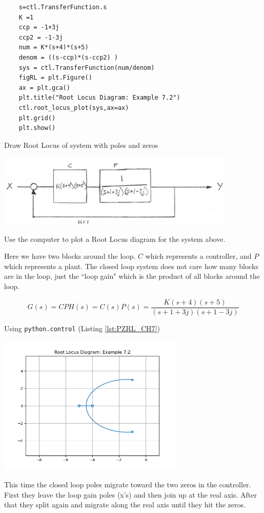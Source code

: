\vspace{0.75in}

\begin{listing}
  \begin{verbatim}
    s=ctl.TransferFunction.s
    K =1
    ccp = -1+3j
    ccp2 = -1-3j
    num = K*(s+4)*(s+5)
    denom = ((s-ccp)*(s-ccp2) )
    sys = ctl.TransferFunction(num/denom)
    figRL = plt.Figure()
    ax = plt.gca()
    plt.title("Root Locus Diagram: Example 7.2")
    ctl.root_locus_plot(sys,ax=ax)
    plt.grid()
    plt.show()
  \end{verbatim}
  \caption{Draw Root Locus of system with poles and zeros}
  \label{lst:PZRL_CH7}
\end{listing}

\begin{ExampleSmall}\label{contplantrootlocus}


\includegraphics[width=4.5in]{figs07/00780a.png}


Use the computer to plot a Root Locus diagram for the system above.

Here we have two blocks around the loop.  $C$ which represents a controller, and $P$ which represents a plant.  The closed loop system does not care how many blocks are in the loop, just the ``loop gain" which is the product of all blocks around the loop.

\[
G(s) = CPH(s) = C(s)P(s) = \frac {K(s+4)(s+5)}   {(s+1+3j)(s+1-3j)}
\]

\vspace{0.25in}
Using {\tt python.control} (Listing \ref{lst:PZRL_CH7})



\includegraphics[width=3.5in]{figs07/B26H83.png}

This time the closed loop poles migrate toward the two zeros in the controller.  First they leave the loop gain poles (x's) and then join up at the real axis. After that  they split again and migrate along the real axis until they hit the zeros.
\end{ExampleSmall}
